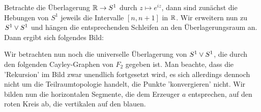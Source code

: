 \begin{example}
    Betrachte die Überlagerung $\mathbb{R} \to  S^1$ durch $z \mapsto e^{iz}$, dann sind zunächst die Hebungen von $S^1$ jeweils die Intervalle  $[n,n+1]$ in  $\mathbb{R}$. Wir erweitern nun zu $S^1 \vee S^1$ und hängen die entsprechenden Schleifen an den Überlagerungsraum an. Dann ergibt sich folgendes Bild:
\end{example}

\begin{example}
    Wir betrachten nun noch die universelle Überlagerung von $S^1 \vee S^1$, die durch den folgenden Cayley-Graphen von $F_2$ gegeben ist. Man beachte, dass die 'Rekursion' im Bild zwar unendlich fortgesetzt wird, es sich allerdings dennoch nicht um die Teilraumtopologie handelt, die Punkte 'konvergieren' nicht. Wir bilden nun die horizontalen Segmente, die dem Erzeuger $a$ entsprechen, auf den roten Kreis ab, die vertikalen auf den blauen.

\end{example}


